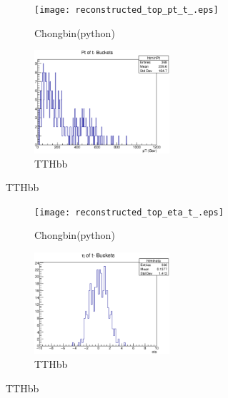 \documentclass{beamer}
\begin{document}
\begin{frame}
  \begin{figure}[!h]
  \captionsetup[subfigure]{labelformat=empty}
  \begin{subfigure}{.5\textwidth}
  \centering
  \texttt{[image: reconstructed\_top\_pt\_t\_.eps]}
  \caption{Chongbin(python)}
  \end{subfigure} \hfill
  \begin{subfigure}{.5\textwidth}
  \centering
  \includegraphics[width=5cm]{htminPt_alljetregion.eps}
  \caption{TTHbb}
  \end{subfigure}
  \end{figure}
\end{frame}

\begin{frame}
  \begin{figure}[!h]
  \captionsetup[subfigure]{labelformat=empty}
  \begin{subfigure}{.5\textwidth}
  \centering
  \texttt{[image: reconstructed\_top\_eta\_t\_.eps]}
  \caption{Chongbin(python)}
  \end{subfigure} \hfill
  \begin{subfigure}{.5\textwidth}
  \centering
  \includegraphics[width=5cm]{htmineta_alljetregion.eps}
  \caption{TTHbb}
  \end{subfigure}
  \end{figure}
\end{frame}
\end{document}
